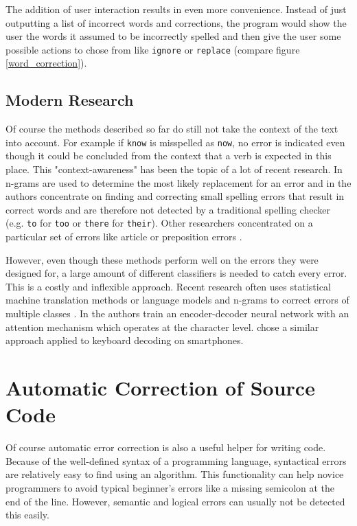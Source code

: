 The addition of user interaction results in even more convenience. Instead of just outputting a list of incorrect words and corrections, the program would show the user the words it assumed to be incorrectly spelled and then give the user some possible actions to chose from like \texttt{ignore} or \texttt{replace} (compare figure \ref{word_correction}).

\subsection{Modern Research}

Of course the methods described so far do still not take the context of the text into account. For example if \texttt{know} is misspelled as \texttt{now}, no error is indicated even though it could be concluded from the context that a verb is expected in this place. This "context-awareness" has been the topic of a lot of recent research. In \cite{context_n_gram} n-grams are used to determine the most likely replacement for an error and in \cite{context_sensitive_spelling} the authors concentrate on finding and correcting small spelling errors that result in correct words and are therefore not detected by a traditional spelling checker (e.g. \texttt{to} for \texttt{too} or \texttt{there} for \texttt{their}). Other researchers concentrated on a particular set of errors like article \cite{article_correction} or preposition errors \cite{preposition_correction}.

However, even though these methods perform well on the errors they were designed for, a large amount of different classifiers is needed to catch every error. This is a costly and inflexible approach. Recent research often uses statistical machine translation methods or language models and n-grams to correct errors of multiple classes \cite{grammatical_error_task}. In \cite{seq2seq_on_text_correction} the authors train an encoder-decoder neural network with an attention mechanism which operates at the character level. \cite{seq2seq_keyboard} chose a similar approach applied to keyboard decoding on smartphones.

\section{Automatic Correction of Source Code}

Of course automatic error correction is also a useful helper for writing code. Because of the well-defined syntax of a programming language, syntactical errors are relatively easy to find using an algorithm. This functionality can help novice programmers to avoid typical beginner's errors like a missing semicolon at the end of the line. However, semantic and logical errors can usually not be detected this easily.

